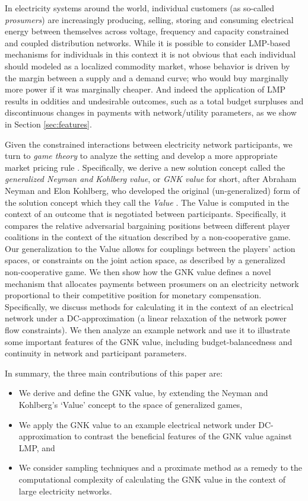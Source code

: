 In electricity systems around the world, individual customers (as so-called \emph{prosumers}) are increasingly producing, selling, storing and consuming electrical energy between themselves across voltage, frequency and capacity constrained and coupled distribution networks.
While it is possible to consider LMP-based mechanisms for individuals in this context \cite{lmp1} it is not obvious that each individual should modeled as a localized commodity market, whose behavior is driven by the margin between a supply and a demand curve; who would buy marginally more power if it was marginally cheaper.
And indeed the application of LMP results in oddities and undesirable outcomes, such as a total budget surpluses and discontinuous changes in payments with network/utility parameters, as we show in Section \ref{sec:features}.

Given the constrained interactions between electricity network participants, we turn to \emph{game theory} to analyze the setting and develop a more appropriate market pricing rule \cite{book1}.
Specifically, we derive a new solution concept called the \emph{generalized Neyman and Kohlberg value}, or \textit{GNK value} for short, after Abraham Neyman and Elon Kohlberg, who developed the original (un-generalized) form of the solution concept which they call the \textit{Value} \cite{value2}.
The {Value} is computed in the context of an outcome that is negotiated between participants.
Specifically, it compares the relative adversarial bargaining positions between different player coalitions in the context of the situation described by a non-cooperative game.
Our generalization to the Value allows for couplings between the players' action spaces, or constraints on the joint action space, as described by a generalized non-cooperative game.
We then show how the GNK value defines a novel mechanism that allocates payments between prosumers on an electricity network proportional to their competitive position for monetary compensation.
Specifically, we discuss methods for calculating it in the context of an electrical network under a DC-approximation (a linear relaxation of the network power flow constraints). 
We then analyze an example network and use it to illustrate some important features of the GNK value, including budget-balancedness and continuity in network and participant parameters.

In summary, the three main contributions of this paper are: 
\begin{itemize}
\item We derive and define the GNK value, by extending the Neyman and Kohlberg's `Value' concept to the space of generalized games,
\item We apply the GNK value to an example electrical network under DC-approximation to contrast the beneficial features of the GNK value against LMP, and
\item We consider sampling techniques and a proximate method as a remedy to the computational complexity of calculating the GNK value in the context of large electricity networks.
\end{itemize}

